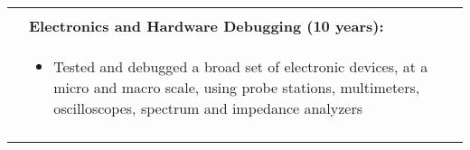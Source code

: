 \begin{tabular}{L{\hlcolw}  L{\rcolw}}
\begin{itemize}[leftmargin = \itemmargin]
	\end{itemize} 
	\\

	& \textbf{Electronics and Hardware Debugging (10 years):} \\
	&
	\vspace{-0.25in}
	\begin{itemize}[leftmargin = \itemmargin]
		\item Tested and debugged a broad set of electronic devices, at a micro and macro scale, using probe stations, multimeters, oscilloscopes, spectrum and impedance analyzers
	\end{itemize}
	\\

	\hline \\
\end{tabular}